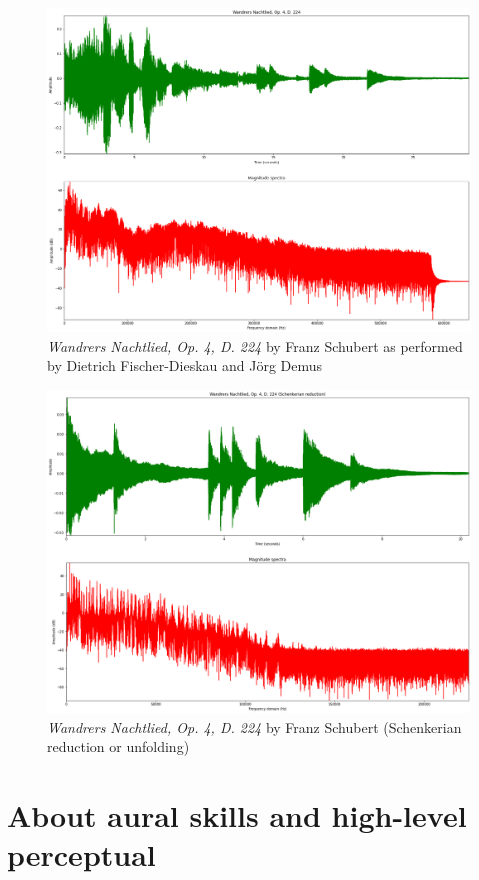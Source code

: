 \begin{figure}[!ht]
\includegraphics[clip,width=\columnwidth]{figures/schenkerian analysis/schubert.png}%
\caption{\textit{Wandrers Nachtlied, Op. 4, D. 224} by Franz Schubert as performed by Dietrich Fischer-Dieskau and Jörg Demus}
\label{fig:timeseries}
\end{figure}

\begin{figure}[!ht]
\includegraphics[clip,width=\columnwidth]{figures/schenkerian analysis/subert redu.png}%
\caption{\textit{Wandrers Nachtlied, Op. 4, D. 224} by Franz Schubert (Schenkerian reduction or unfolding)}
\label{fig:timeseries}
\end{figure}


\section{About aural skills and high-level perceptual}